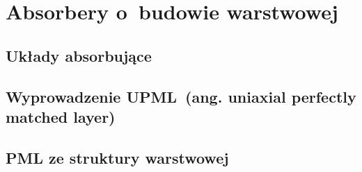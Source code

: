 \chapter{Absorbery o~budowie warstwowej}
\label{roz:pml}

\section{Układy absorbujące}

\section{Wyprowadzenie UPML~(ang. uniaxial perfectly matched layer)}

\section{PML ze struktury warstwowej~\cite{ania2015}}

